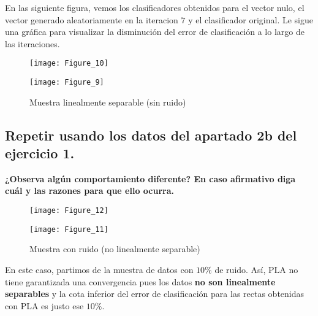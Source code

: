 En las siguiente figura, vemos los clasificadores obtenidos para el vector nulo, el vector
generado aleatoriamente en la iteracion $7$ y el clasificador original. Le sigue una gráfica
para visualizar la disminución del error de clasificación a lo largo de las iteraciones.

\begin{figure}[H]
  \caption{Muestra linealmente separable (sin ruido)}\par\medskip
  \begin{minipage}[b]{.5\linewidth}
    \centering
    \texttt{[image: Figure\_10]}
     \label{subfig-4:dummy2}
  \end{minipage}
  \hfill \hfill
  \begin{minipage}[b]{.5\linewidth}
    \centering
    \texttt{[image: Figure\_9]}
  \end{minipage}
  \label{fig:dummy3}
\end{figure}

\subsection{Repetir usando los datos del apartado 2b del ejercicio 1.}
\textbf{¿Observa algún comportamiento diferente? En caso afirmativo diga cuál y las
razones para que ello ocurra.}

\begin{figure}[H]
  \caption{Muestra con ruido (no linealmente separable)}\par\medskip
  \begin{minipage}[b]{.5\linewidth}
    \centering
    \texttt{[image: Figure\_12]}
     \label{subfig-4:dummy6}
  \end{minipage}
  \hfill \hfill
  \begin{minipage}[b]{.5\linewidth}
    \centering
    \texttt{[image: Figure\_11]}
  \end{minipage}
  \label{fig:dummy9}
\end{figure}


En este caso, partimos de la muestra de datos con $10\%$ de ruido. Así, PLA no tiene
garantizada una convergencia pues los datos \textbf{no son linealmente separables} y 
la cota inferior del error de clasificación para las rectas obtenidas con PLA
es justo ese $10\%$.

